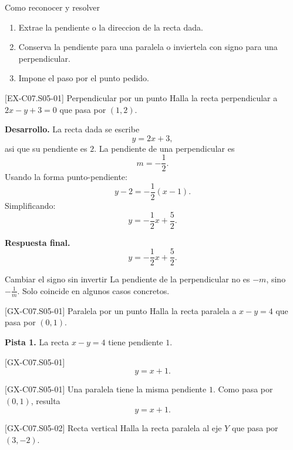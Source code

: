 \begin{methodbox}{Como reconocer y resolver}
\begin{enumerate}
  \item Extrae la pendiente o la direccion de la recta dada.
  \item Conserva la pendiente para una paralela o inviertela con signo para una perpendicular.
  \item Impone el paso por el punto pedido.
\end{enumerate}
\end{methodbox}

\begin{solvedexample}{[EX-C07.S05-01] Perpendicular por un punto}
Halla la recta perpendicular a \(2x-y+3=0\) que pasa por \((1,2)\).

\textbf{Desarrollo.} La recta dada se escribe
\[
y=2x+3,
\]
asi que su pendiente es \(2\). La pendiente de una perpendicular es
\[
m=-\frac{1}{2}.
\]
Usando la forma punto-pendiente:
\[
y-2=-\frac{1}{2}(x-1).
\]
Simplificando:
\[
y=-\frac{1}{2}x+\frac{5}{2}.
\]

\textbf{Respuesta final.}
\[
y=-\frac{1}{2}x+\frac{5}{2}.
\]
\end{solvedexample}

\begin{commonerror}{Cambiar el signo sin invertir}
La pendiente de la perpendicular no es \(-m\), sino \(-\frac{1}{m}\). Solo coincide en algunos
casos concretos.
\end{commonerror}

\begin{guidedexercise}{[GX-C07.S05-01] Paralela por un punto}
Halla la recta paralela a \(x-y=4\) que pasa por \((0,1)\).

\textbf{Pista 1.} La recta \(x-y=4\) tiene pendiente \(1\).
\end{guidedexercise}

\begin{shortanswer}{[GX-C07.S05-01]}
\[
y=x+1.
\]
\end{shortanswer}

\begin{fullsolution}{[GX-C07.S05-01]}
Una paralela tiene la misma pendiente \(1\). Como pasa por \((0,1)\), resulta
\[
y=x+1.
\]
\end{fullsolution}

\begin{guidedexercise}{[GX-C07.S05-02] Recta vertical}
Halla la recta paralela al eje \(Y\) que pasa por \((3,-2)\).
\end{guidedexercise}

